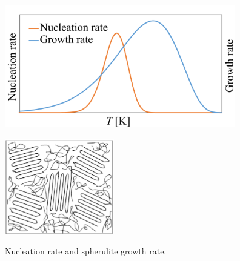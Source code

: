 \begin{figure}[htbp]
    \begin{minipage}[htbp]{0.45\linewidth}
      \centering
      \includegraphics[keepaspectratio, scale=0.7]{fig/fig_模式図.png}
      \label{fig:模式図}
    \end{minipage}
    \begin{minipage}[htbp]{0.45\linewidth}
      \centering
      \includegraphics[keepaspectratio, scale=1]{fig/fig_crystalline.png}
      \label{fig:ポリプロピレン成長速度}
    \end{minipage}
    \centering
    \caption{Nucleation rate and spherulite growth rate.}
    \label{fig:核生成速度と成長速度}
\end{figure}